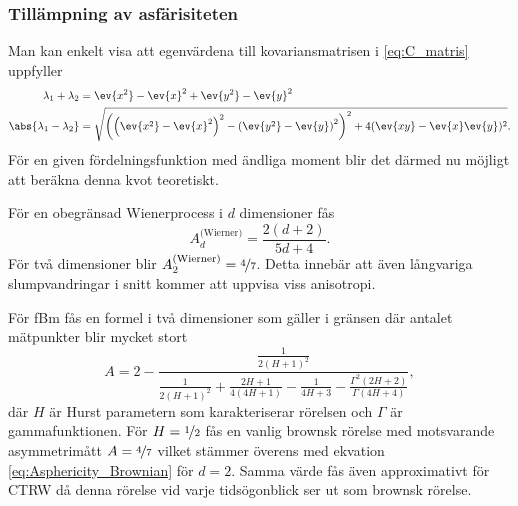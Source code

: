 \subsubsection{Tillämpning av asfärisiteten}
Man kan enkelt visa att egenvärdena till kovariansmatrisen i \eqref{eq:C_matris} uppfyller~\cite{Hong_asymmetri1998}
\begin{equation}
\begin{aligned}
\lambda_1+\lambda_2 
&= \ev{x^2}-\ev{x}^2+\ev{y^2}-\ev{y}^2 
\\
\abs{\lambda_1-\lambda_2} 
&=\sqrt{\left(
            \left(\ev{x^2}-\ev{x}^2\right)^2
            -\left(\ev{y^2}-\ev{y}\right)^2
        \right)^2 
        +4(\ev{xy}-\ev{x}\ev{y})^2
}.
\end{aligned}
\end{equation}
För en given fördelningsfunktion med ändliga moment blir det därmed nu möjligt att beräkna denna kvot teoretiskt.

För en obegränsad Wienerprocess i $d$ dimensioner fås~\cite{Rudnick_Asphericity1986}
\begin{equation} \label{eq:Asphericity_Brownian}
    A_d^\text{(Wierner)}=\frac{2(d+2)}{5d+4}.
\end{equation}
För två dimensioner blir $A_2^\text{(Wierner)}=\nicefrac{4}{7}$. Detta innebär att även långvariga slumpvandringar i snitt kommer att uppvisa viss anisotropi.

För fBm fås en formel i två dimensioner som gäller i gränsen där antalet mätpunkter blir mycket stort ~\cite{Hong_asymmetri1998}
\begin{equation} \label{eq:A_fBm}
A=2-
\frac{\frac{1}{2(H+1)^2}}{\frac{1}{2(H+1)^2}+\frac{2H+1}{4(4H+1)}-\frac{1}{4H+3}-\frac{\Gamma^2(2H+2)}{\Gamma(4H+4)}},
\end{equation}
där $H$ är Hurst parametern som karakteriserar rörelsen och $\Gamma$ är gammafunktionen. För $H=\nicefrac{1}{2}$ fås en vanlig brownsk rörelse med motsvarande  asymmetrimått $A=\nicefrac{4}{7}$ vilket stämmer överens med ekvation \eqref{eq:Asphericity_Brownian} för $d=2$. Samma värde fås även approximativt för CTRW\cite{Ernst_ACTRW2012} då denna rörelse vid varje tidsögonblick ser ut som brownsk rörelse. 




 

